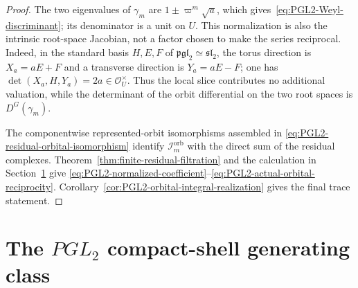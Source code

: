 \documentclass[11pt]{article}
\theoremstyle{definition}
\theoremstyle{remark}
\begin{document}
\begin{proof}
The two eigenvalues of $\gamma_m$ are
$1\pm\varpi^m\sqrt a$, which gives~\eqref{eq:PGL2-Weyl-discriminant}; its
denominator is a unit on $U$.  This normalization is also the intrinsic
root-space Jacobian, not a factor chosen to make the series reciprocal.
Indeed, in the standard basis $H,E,F$ of
$\mathfrak{pgl}_2\simeq\mathfrak{sl}_2$, the torus direction is
$X_a=aE+F$ and a transverse direction is $Y_a=aE-F$; one has
$\det(X_a,H,Y_a)=2a\in\mathcal O_U^\times$.  Thus the local slice contributes
no additional valuation, while the determinant of the orbit differential on
the two root spaces is $D^G(\gamma_m)$.

The componentwise represented-orbit
isomorphisms assembled in
\eqref{eq:PGL2-residual-orbital-isomorphism} identify
$\mathcal I_m^{\mathrm{orb}}$ with the direct sum of the residual complexes.
Theorem~\ref{thm:finite-residual-filtration} and the calculation in
Section~\ref{sec:quadratic-residual-series} give
\eqref{eq:PGL2-normalized-coefficient}--\eqref{eq:PGL2-actual-orbital-reciprocity}.
Corollary~\ref{cor:PGL2-orbital-integral-realization} gives the final trace
statement.
\end{proof}


\section{The \texorpdfstring{$PGL_2$}{PGL2} compact-shell generating class}
\label{sec:quadratic-residual-series}
\end{document}
